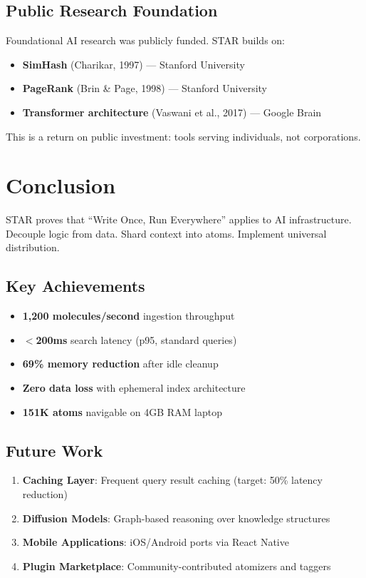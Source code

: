 \documentclass[11pt]{article}
\begin{document}
\subsection{Public Research Foundation}

Foundational AI research was publicly funded. STAR builds on:
\begin{itemize}
    \item \textbf{SimHash} (Charikar, 1997) --- Stanford University
    \item \textbf{PageRank} (Brin \& Page, 1998) --- Stanford University
    \item \textbf{Transformer architecture} (Vaswani et al., 2017) --- Google Brain
\end{itemize}

This is a return on public investment: tools serving individuals, not corporations.

\section{Conclusion}
\label{sec:conclusion}

STAR proves that ``Write Once, Run Everywhere'' applies to AI infrastructure. Decouple logic from data. Shard context into atoms. Implement universal distribution.

\subsection{Key Achievements}

\begin{itemize}
    \item \checkmark \textbf{1,200 molecules/second} ingestion throughput
    \item \checkmark \textbf{$<$200ms} search latency (p95, standard queries)
    \item \checkmark \textbf{69\% memory reduction} after idle cleanup
    \item \checkmark \textbf{Zero data loss} with ephemeral index architecture
    \item \checkmark \textbf{151K atoms} navigable on 4GB RAM laptop
\end{itemize}

\subsection{Future Work}

\begin{enumerate}
    \item \textbf{Caching Layer}: Frequent query result caching (target: 50\% latency reduction)
    \item \textbf{Diffusion Models}: Graph-based reasoning over knowledge structures
    \item \textbf{Mobile Applications}: iOS/Android ports via React Native
    \item \textbf{Plugin Marketplace}: Community-contributed atomizers and taggers
\end{enumerate}
\end{document}
